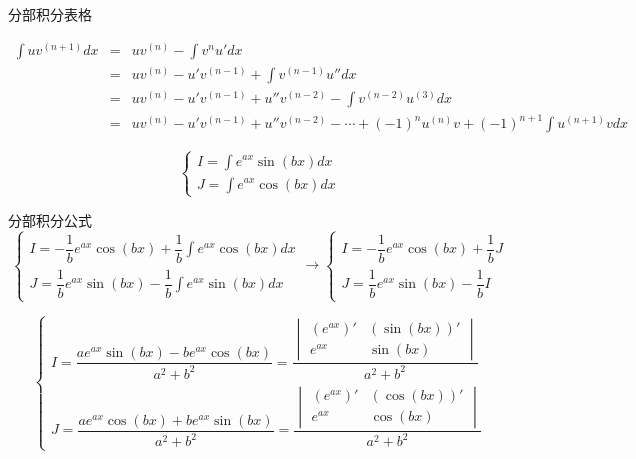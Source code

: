 \begin{table}[ht]
	\centering
	\caption{分部积分表格}
	\label{table: 分部积分表格法}
\end{table}
\begin{theorem}
	\begin{eqnarray*}
		\int uv^{(n+1)}dx & = & uv^{(n)} - \int v^{n}u'dx \\
			              & = & uv^{(n)} - u'v^{(n-1)} + \int v^{(n-1)}u''dx\\
			              & = & uv^{(n)} - u'v^{(n-1)} +  u''v^{(n-2)} -\int v^{(n-2)}u^{(3)}dx\\
			              & = & uv^{(n)} - u'v^{(n-1)} +  u''v^{(n-2)} -\cdots + (-1)^{n}u^{(n)}v + (-1)^{n+1}\int u^{(n+1)}vdx
	\end{eqnarray*}
\end{theorem}
\begin{theorem}[组合积分]
\begin{proposition}
	$$\begin{cases} I = \int e^{ax}\sin (bx)dx\\ J = \int e^{ax} \cos (bx)dx\end{cases}$$
\end{proposition}
\begin{solution}
	
	分部积分公式
	$$\begin{cases}
		I = -\dfrac{1}{b}e^{ax}\cos (bx) + \dfrac{1}{b}\int e^{ax}\cos (bx) dx \\ 
		J = \dfrac{1}{b}e^{ax}\sin (bx) - \dfrac{1}{b}\int e^{ax}\sin (bx) dx  
	\end{cases}\to 
	\begin{cases} 
		I = -\dfrac{1}{b}e^{ax}\cos (bx) + \dfrac{1}{b}J \\ 
		J = \dfrac{1}{b}e^{ax}\sin (bx) - \dfrac{1}{b}I  
	\end{cases}$$

	$$\begin{cases} 
		I = \dfrac{ae^{ax}\sin(bx)-be^{ax}\cos(bx)}{a^{2}+b^{2}} = \dfrac{\begin{vmatrix}(e^{ax})' & (\sin(bx))'\\ e^{ax} & \sin(bx)\end{vmatrix}}{a^{2}+b^{2}}\\ 
		J = \dfrac{ae^{ax}\cos(bx) + be^{ax}\sin(bx)}{a^{2}+b^{2}} = \dfrac{\begin{vmatrix}(e^{ax})' & (\cos(bx))'\\ e^{ax} & \cos(bx)\end{vmatrix}}{a^{2}+b^{2}}   
	\end{cases}$$
\end{solution}
\end{theorem}

